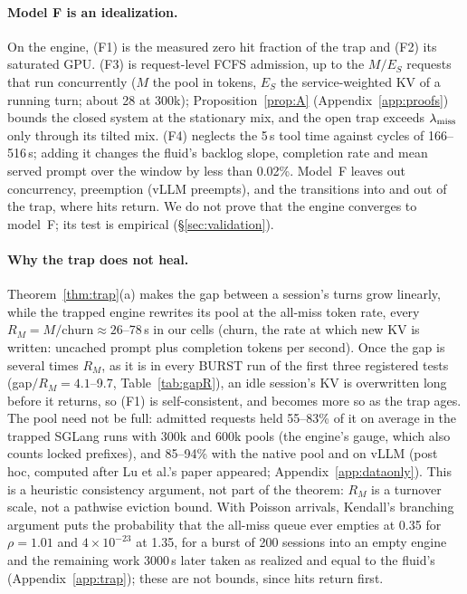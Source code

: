 \paragraph{Model F is an idealization.} On the engine, (F1) is the measured zero hit fraction of the trap and (F2) its saturated
GPU. (F3) is request-level FCFS admission, up to the $M/E_S$ requests that run concurrently ($M$ the pool in tokens, $E_S$ the
service-weighted KV of a running turn; about 28 at 300k); Proposition~\ref{prop:A} (Appendix~\ref{app:proofs}) bounds the closed system at the stationary mix,
and the open trap exceeds $\lambda_{\mathrm{miss}}$ only through its tilted mix. (F4) neglects the 5\,s tool time against cycles of 166--516\,s; adding
it changes the fluid's backlog slope, completion rate and mean served prompt over the window by less than 0.02\%. Model~F leaves out
concurrency, preemption (vLLM preempts), and the transitions into and out of the trap, where hits return. We do not prove that the
engine converges to model~F; its test is empirical (\S\ref{sec:validation}).

\paragraph{Why the trap does not heal.} Theorem~\ref{thm:trap}(a) makes the gap between a session's turns grow linearly, while the
trapped engine rewrites its pool at the all-miss token rate, every $R_M=M/\text{churn}\approx26$--78\,s in our cells (churn, the rate
at which new KV is written: uncached prompt plus completion tokens per second). Once the gap is several times $R_M$, as it is in
every BURST run of the first three registered tests (gap$/R_M=4.1$--9.7, Table~\ref{tab:gapR}), an idle session's KV is overwritten
long before it returns, so (F1) is self-consistent, and becomes more so as the trap ages. The pool need not be full: admitted
requests held 55--83\% of it on average in the trapped SGLang runs with 300k and 600k pools (the engine's gauge, which also counts
locked prefixes), and 85--94\% with the native pool and on
vLLM (post hoc, computed after Lu et al.'s paper appeared; Appendix~\ref{app:dataonly}). This is a heuristic consistency argument, not part of the theorem: $R_M$ is a turnover scale, not a pathwise eviction bound. With
Poisson arrivals, Kendall's branching argument puts the probability that the all-miss queue ever empties at 0.35 for $\rho=1.01$ and
$4\times10^{-23}$ at 1.35, for a burst of 200 sessions into an empty engine and the remaining work 3000\,s later taken as realized
and equal to the fluid's (Appendix~\ref{app:trap}); these are not bounds, since hits return first.
